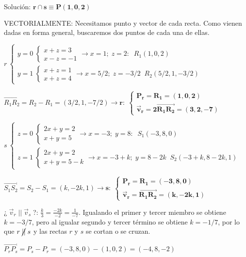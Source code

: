 \begin{proofw}
\noindent Solución: $\boldsymbol{r \cap s \equiv P(1,0,2)}$

\noindent VECTORIALMENTE: Necesitamos punto y vector de cada recta. Como vienen dadas en forma general, buscaremos dos puntos de cada una de ellas.

\noindent $r\: \begin{cases}
 y=0\; \begin{cases} x+z=3\\x-z=-1 \end{cases} \to x=1; \; z=2: \; \; R_1(1,0,2)
 \\
 y=1\; \begin{cases} x+z=1\\x+z=4 \end{cases} \to x=5/2; \; z=-3/2\;\; R_2(5/2,1,-3/2)	
\end{cases}$

\noindent $\overrightarrow{R_1R_2}=R_2-R_1=(3/2,1,-7/2) \to \boldsymbol{  r:\; \begin{cases} P_r=R_1=(1,0,2)\\ \vec v_r=2\overrightarrow{R_1R_2}=(3,2,-7) \end{cases}}$

\noindent $s\: \begin{cases}
 z=0\; \begin{cases} 2x+y=2\\x+y=5 \end{cases} \to x=-3; \;y=8: \; \; S_1(-3,8,0)
 \\
 z=1\; \begin{cases} 2x+y=2\\x+y=5-k \end{cases} \to x=-3+k; \; y=8-2k\;\; S_2(-3+k,8-2k,1)	
\end{cases}$

\noindent $\overrightarrow{S_1S_2}=S_2-S_1=(k,-2k,1) \to \boldsymbol{  s:\; \begin{cases} P_r=R_1=(-3,8,0)\\ \vec v_r=\overrightarrow{R_1R_2}=(k,-2k,1) \end{cases}}$

\noindent ¿$\;\vec v_r\;||\;\vec v_s\;$?: $\frac{k}{3}=\frac{-2k}{-2}=\frac{1}{-7}$. Igualando el primer y tercer miembro se obtiene $k=-3/7$, pero al igualar segundo y tercer término se obtiene $k=-1/7$, por lo que 
$r\;\cancel{||}\;s$ y las rectas $r$ y $s$ se cortan o se cruzan.

\noindent $\overrightarrow{P_rP_s}=P_s-P_r=(-3,8,0)-(1,0,2)=(-4,8,-2) $


\end{proofw}
